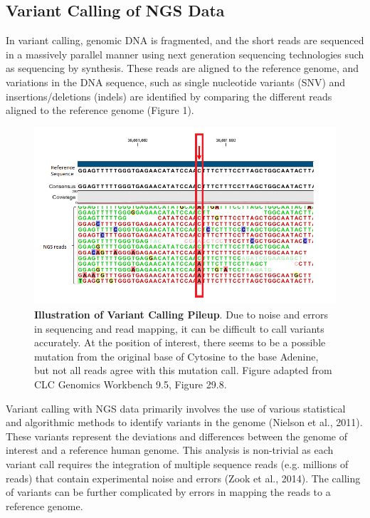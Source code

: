 \documentclass{article}
\begin{document}
\subsection{Variant Calling of NGS Data}
In variant calling, genomic DNA is fragmented, and the short reads are sequenced in a massively parallel manner using next generation sequencing technologies such as sequencing by synthesis. These reads are aligned to the reference genome, and variations in the DNA sequence, such as single nucleotide variants (SNV) and insertions/deletions (indels) are identified by comparing the different reads aligned to the reference genome (Figure 1).
\begin{figure}[H]
\includegraphics[width=\textwidth]{ngsreads.png}
\centering
\caption{ \textbf{Illustration of Variant Calling Pileup}. Due to noise and errors in sequencing and read mapping, it can be difficult to call variants accurately. At the position of interest, there seems to be a possible mutation from the original base of Cytosine to the base Adenine, but not all reads agree with this mutation call. Figure adapted from CLC Genomics Workbench 9.5, Figure 29.8.}
\end{figure}
Variant calling with NGS data primarily involves the use of various statistical and algorithmic methods to identify variants in the genome (Nielson et al., 2011). These variants represent the deviations and differences between the genome of interest and a reference human genome. This analysis is non-trivial as each variant call requires the integration of multiple sequence reads (e.g. millions of reads) that contain experimental noise and errors (Zook et al., 2014). The calling of variants can be further complicated by errors in mapping the reads to a reference genome.\\\\
\end{document}
